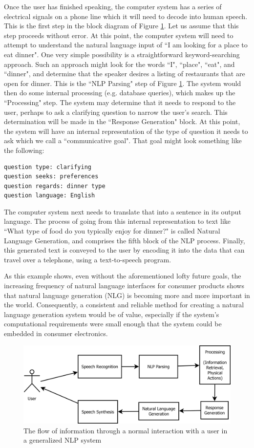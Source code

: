Once the user has finished speaking, the computer system has a series of electrical signals on
a phone line which it will need to decode into human speech.  This is the first step
in the block diagram of Figure \ref{nlp-block}.  Let us assume that this step proceeds without
error.  At this point, the computer system will need to attempt to understand the natural
language input of ``I am looking for a place to eat dinner". One very simple possibility is
a straightforward keyword-searching approach.  Such an approach might look for the words ``I",
``place", ``eat", and ``dinner", and determine that the speaker desires a listing of restaurants that
are open for dinner.  This is the ``NLP Parsing" step of Figure \ref{nlp-block}.  The system would
then do some internal processing (e.g. database queries), which makes up the ``Processing"
step.  The system may determine that it needs to respond to the user, perhaps to ask a
clarifying question to narrow the user's search.  This determination will be made in the
``Response Generation" block.  At this point, the system will have an internal representation
of the type of question it needs to ask which we call a ``communicative goal".  That goal might
look something like the following:
\begin{verbatim}
question type: clarifying
question seeks: preferences
question regards: dinner type
question language: English
\end{verbatim}

The computer system next needs to translate that into a sentence in its output
language.  The process of going from this internal representation to text like
``What type of food do you typically enjoy for dinner?" is called Natural Language Generation,
and comprises the fifth block of the NLP process.  Finally, this generated text is conveyed to
the user by encoding it into the data that can travel over a telephone, using a text-to-speech
program.

As this example shows, even without the aforementioned lofty future goals,
the increasing frequency of natural language interfaces for consumer
products shows that natural language generation (NLG) is becoming more and more important
in the world.  Consequently, a consistent and reliable method for creating a natural
language generation system would be of value, especially if the system's
computational requirements were small enough that the system could be embedded
in consumer electronics.

\begin{figure}
\centering
\includegraphics[width=0.8 \linewidth]{nlp-block.png}
\caption{The flow of information through a normal interaction
with a user in a generalized NLP system}
\label{nlp-block}
\end{figure}

